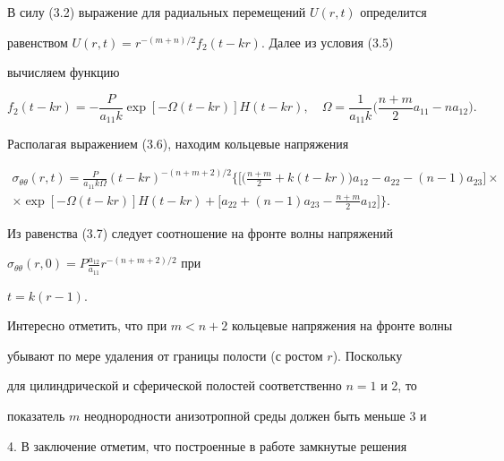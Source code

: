 В силу (3.2) выражение для радиальных перемещений $U(r,t)$ определится 


равенством $U(r,t)=r^{-(m+n)/2}f_2(t-kr)$. Далее из условия (3.5) 


вычисляем функцию 


\begin{equation} 


f_2(t-kr)=-\frac{P}{a_{11}k}\exp[-\Omega(t-kr)]H(t-kr),\quad 


\Omega=\frac{1}{a_{11}k}\biggl(\frac{n+m}{2}a_{11}-n a_{12} 


\biggr). 


\end{equation} 


 


Располагая выражением (3.6), находим кольцевые напряжения 


\begin{multline} 


\sigma_{\theta\theta}(r,t)=\frac{P}{a_{11}k\Omega} 


(t-kr)^{-(n+m+2)/2}\biggl\{\biggl[\biggl(\frac{n+m}{2} 


+k(t-kr)\biggr)a_{12}-a_{22}-(n-1)a_{23}\biggr] \times \\


\times \exp[-\Omega(t-kr)]H(t-kr)+\biggl[a_{22}+(n-1)a_{23}- 


\frac{n+m}{2}a_{12}\biggr]\biggr\}. 


\end{multline} 


Из равенства (3.7) следует соотношение на фронте волны напряжений 


$\sigma_{\theta\theta}(r,0)= 


P\frac{a_{12}}{a_{11}}r^{-(n+m+2)/2}$ при 


$t=k(r-1)$. 


 


Интересно отметить, что при $m<n+2$ кольцевые напряжения на фронте волны 


убывают по мере удаления от границы полости (с ростом $r$). Поскольку 


для цилиндрической и сферической полостей соответственно $n=1$ и 2, то 


показатель $m$ неоднородности анизотропной среды должен быть меньше 3 и 


4. В заключение отметим, что построенные в работе замкнутые решения 


